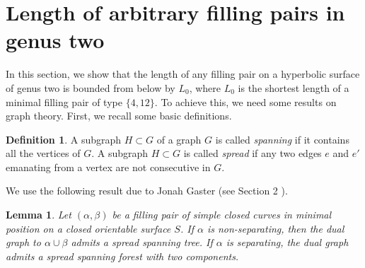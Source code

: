 \documentclass[11pt,reqno]{amsart}
\theoremstyle{plain}
\newtheorem{lemma}[theorem]{Lemma}
\theoremstyle{definition}
\newtheorem{definition}[theorem]{Definition}
\theoremstyle{remark}
\numberwithin{equation}{section}
\numberwithin{figure}{section}
\begin{document}

\section{Length of arbitrary filling pairs in genus two}
In this section, we show that the length of any filling pair on a hyperbolic surface of genus two is bounded from below by $L_0$, where $L_0$ is the shortest length of a minimal filling pair of type $\{ 4,12 \}$. To achieve this, we need some results on graph theory. First, we recall some basic definitions.

\begin{definition}
    A subgraph $H\subset G$ of a graph $G$ is called \textit{spanning} if it contains all the vertices of $G$. A subgraph $H\subset G$ is called \textit{spread} if any two edges $e$ and $e'$ emanating from a vertex are not consecutive in $G$.
\end{definition}

We use the following result due to Jonah Gaster (see Section 2 \cite{Gaster}).
\begin{lemma}\label{lem 4.2}
    Let $(\alpha,\beta)$ be a filling pair of simple closed curves in minimal position on a closed orientable surface $S$. If $\alpha$ is non-separating, then the dual graph to $\alpha \cup \beta$ admits a spread spanning tree. If $\alpha$ is separating, the dual graph admits a spread spanning forest with two components.
\end{lemma}
\end{document}
